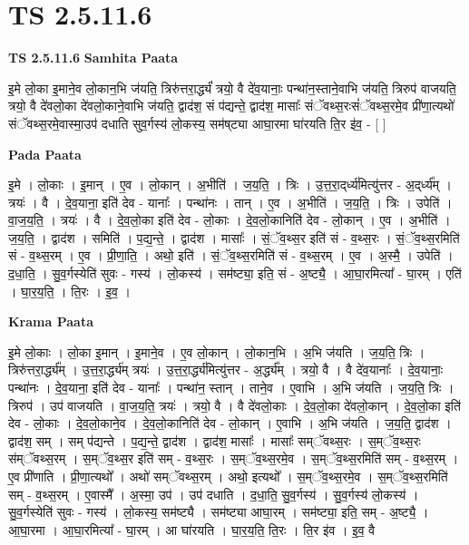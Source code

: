 \documentclass[17pt]{extarticle}
\begin{document}
\section*{ TS 2.5.11.6 }

\textbf{TS 2.5.11.6 } \newline
\textbf{Samhita Paata} \newline

इ॒मे लो॒का इ॒माने॒व लो॒कान॒भि ज॑यति॒ त्रिरु॑त्तरा॒र्द्ध्यं॑ त्रयो॒ वै दे॑व॒यानाः॒ पन्था॑न॒स्ताने॒वाभि ज॑यति॒ त्रिरुप॑ वाजयति॒ त्रयो॒ वै दे॑वलो॒का दे॑वलो॒काने॒वाभि ज॑यति॒ द्वाद॑श॒ सं प॑द्यन्ते॒ द्वाद॑श॒ मासाः᳚ संॅवथ्स॒रःसं॑ॅवथ्स॒रमे॒व प्री॑णा॒त्यथो॑ संॅवथ्स॒रमे॒वास्मा॒उप॑ दधाति सुव॒र्गस्य॑ लो॒कस्य॒ सम॑ष्‌ट्या आघा॒रमा घा॑रयति ति॒र इ॑व॒ - [  ] \newline

\textbf{Pada Paata} \newline

इ॒मे । लो॒काः । इ॒मान् । ए॒व । लो॒कान् । अ॒भीति॑ । ज॒य॒ति॒ । त्रिः । उ॒त्त॒रा॒द्‌र्ध्य॑मित्यु॑त्तर - अ॒द्‌र्ध्य᳚म् । त्रयः॑ । वै । दे॒व॒याना॒ इति॑ देव - यानाः᳚ । पन्था॑नः । तान् । ए॒व । अ॒भीति॑ । ज॒य॒ति॒ । त्रिः । उपेति॑ । वा॒ज॒य॒ति॒ । त्रयः॑ । वै । दे॒व॒लो॒का इति॑ देव - लो॒काः । दे॒व॒लो॒कानिति॑ देव - लो॒कान् । ए॒व । अ॒भीति॑ । ज॒य॒ति॒ । द्वाद॑श । समिति॑ । प॒द्य॒न्ते॒ । द्वाद॑श । मासाः᳚ । सं॒ॅव॒थ्स॒र इति॑ सं - व॒थ्स॒रः । सं॒ॅव॒थ्स॒रमिति॑ सं - व॒थ्स॒रम् । ए॒व । प्री॒णा॒ति॒ । अथो॒ इति॑ । सं॒ॅव॒थ्स॒रमिति॑ सं - व॒थ्स॒रम् । ए॒व । अ॒स्मै॒ । उपेति॑ । द॒धा॒ति॒ । सु॒व॒र्गस्येति॑ सुवः - गस्य॑ । लो॒कस्य॑ । सम॑ष्ट्या॒ इति॒ सं - अ॒ष्ट्यै॒ । आ॒घा॒रमित्या᳚ - घा॒रम् । एति॑ । घा॒र॒य॒ति॒ । ति॒रः । इ॒व॒ ।  \newline


\textbf{Krama Paata} \newline

इ॒मे लो॒काः । लो॒का इ॒मान् । इ॒माने॒व । ए॒व लो॒कान् । लो॒कान॒भि । अ॒भि ज॑यति । ज॒य॒ति॒ त्रिः । त्रिरु॑त्तरा॒र्द्ध्य᳚म् । उ॒त्त॒रा॒र्द्ध्य॑म् त्रयः॑ । उ॒त्त॒रा॒र्द्ध्य॑मित्यु॑त्तर - अ॒र्द्ध्य᳚म् । त्रयो॒ वै । वै दे॑व॒यानाः᳚ । दे॒व॒यानाः॒ पन्था॑नः । दे॒व॒याना॒ इति॑ देव - यानाः᳚ । पन्था॑न॒ स्तान् । ताने॒व । ए॒वाभि । अ॒भि ज॑यति । ज॒य॒ति॒ त्रिः । त्रिरुप॑ । उप॑ वाजयति । वा॒ज॒य॒ति॒ त्रयः॑ । त्रयो॒ वै । वै दे॑वलो॒काः । दे॒व॒लो॒का दे॑वलो॒कान् । दे॒व॒लो॒का इति॑ देव - लो॒काः । दे॒व॒लो॒काने॒व । दे॒व॒लो॒कानिति॑ देव - लो॒कान् । ए॒वाभि । अ॒भि ज॑यति । ज॒य॒ति॒ द्वाद॑श । द्वाद॑श॒ सम् । सम् प॑द्यन्ते । प॒द्य॒न्ते॒ द्वाद॑श । द्वाद॑श॒ मासाः᳚ । मासाः᳚ सम्ॅवथ्स॒रः । स॒म्ॅव॒थ्स॒रः स॑म्ॅवथ्स॒रम् । स॒म्ॅव॒थ्स॒र इति॑ सम् - व॒थ्स॒रः । स॒म्ॅव॒थ्स॒रमे॒व । स॒म्ॅव॒थ्स॒रमिति॑ सम् - व॒थ्स॒रम् । ए॒व प्री॑णाति । प्री॒णा॒त्यथो᳚ । अथो॑ सम्ॅवथ्स॒रम् । अथो॒ इत्यथो᳚ । स॒म्ॅव॒थ्स॒रमे॒व । स॒म्ॅव॒थ्स॒रमिति॑ सम् - व॒थ्स॒रम् । ए॒वास्मै᳚ । अ॒स्मा॒ उप॑ । उप॑ दधाति । द॒धा॒ति॒ सु॒व॒र्गस्य॑ । सु॒व॒र्गस्य॑ लो॒कस्य॑ । सु॒व॒र्गस्येति॑ सुवः - गस्य॑ । लो॒कस्य॒ सम॑ष्ट्यै । सम॑ष्ट्या आघा॒रम् । सम॑ष्ट्या॒ इति॒ सम् - अ॒ष्ट्यै॒ । आ॒घा॒रमा । आ॒घा॒रमित्या᳚ - घा॒रम् । आ घा॑रयति । घा॒र॒य॒ति॒ ति॒रः । ति॒र इ॑व । इ॒व॒ वै \newline
\end{document}
